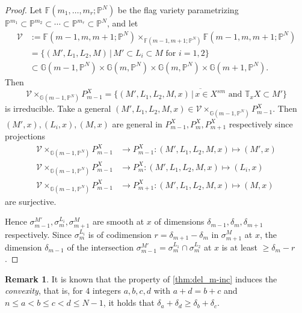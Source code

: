 \documentclass[a4paper,12pt]{amsart}
\theoremstyle{plain}
\theoremstyle{definition}
\newtheorem{rem}[rem]{Remark}
\begin{document}
\begin{proof}

  Let ${\mathbb {F}}(m_1,\ldots,m_r;{\mathbb{P}}^N)$ be the flag variety parametrizing
  ${\mathbb{P}}^{m_1} \subset {\mathbb{P}}^{m_2} \subset \cdots \subset {\mathbb{P}}^{m_r} \subset {\mathbb{P}}^N$,
  and let
  \begin{align*}
    {\mathcal {V}} &:= {\mathbb {F}}(m-1,m,m+1 ; {\mathbb{P}}^N) \times_{ {\mathbb {F}}(m-1, m+1 ; {\mathbb{P}}^N)}  {\mathbb {F}}(m-1,m,m+1 ; {\mathbb{P}}^N) \\
    &=\{ (M' ,L_1,L_2,M) \, | \, M' \subset L_i \subset M \text{ for } i=1,2 \} \\
    &\subset {\mathbb {G}}(m-1,{\mathbb{P}}^N) \times {\mathbb {G}}(m,{\mathbb{P}}^N) \times {\mathbb {G}}(m,{\mathbb{P}}^N) \times {\mathbb {G}}(m+1,{\mathbb{P}}^N) .
  \end{align*}
  Then
  \[
  {\mathcal {V}} \times_{{\mathbb {G}}(m-1,{\mathbb{P}}^N)} P_{m-1}^X =\overline{ \{ (M' ,L_1,L_2,M, x) \, | \, x \in X^{sm} \text{ and }{\mathbb {T}}_x X \subset M'  \} }
  \]
  is irreducible.
  Take a general $(M',L_1,L_2,M, x) \in  {\mathcal {V}} \times_{{\mathbb {G}}(m-1,{\mathbb{P}}^N)} P_{m-1}^X $.
  Then $( M', x) , (L_i, x), (M, x)  $ are general in $P_{m-1}^X, P_{m}^X, P_{m+1}^X$ respectively
  since projections
  \begin{align*}
    {\mathcal {V}} \times_{{\mathbb {G}}(m-1,{\mathbb{P}}^N)} P_{m-1}^X  &{\rightarrow} P_{m-1}^X : ( M',L_1,L_2,M, x) \mapsto ( M', x)   \\
    {\mathcal {V}} \times_{{\mathbb {G}}(m-1,{\mathbb{P}}^N)} P_{m-1}^X  &{\rightarrow} P_{m}^X : ( M',L_1,L_2,M, x) \mapsto  (L_i, x)  \\
    {\mathcal {V}} \times_{{\mathbb {G}}(m-1,{\mathbb{P}}^N)} P_{m-1}^X  &{\rightarrow} P_{m+1}^X : ( M',L_1,L_2,M, x) \mapsto  (M, x)  
  \end{align*}
  are surjective.

  Hence $\sigma_{m-1}^{M'}, \sigma_m^{L_i}, \sigma_{m+1}^{M}$ are smooth at $x$ of dimensions $\delta_{m-1}, \delta_m,\delta_{m+1}$ respectively.
  Since $\sigma_m^{L_i}$ is of codimension $r = \delta_{m+1} - \delta_{m}$ in $\sigma_{m+1}^{M}$ at $x$,
  the dimension $\delta_{m-1}$ of the intersection $ \sigma_{m-1}^{M'}=\sigma_m^{L_1} \cap \sigma_m^{L_2} $ at $x$ is at least ${\geqslant} \delta_m - r$.
\end{proof}

\begin{rem}
  It is known that the property of \autoref{thm:del_m-inc}
  induces the \emph{convexity}, that is,
  for $4$ integers $a,b,c,d$ with $a+d = b+c$ and $n {\leqslant} a < b {\leqslant} c < d {\leqslant} N-1$, it holds that
  $\delta_{a}+\delta_{d} {\geqslant} \delta_{b}+\delta_{c}$.
\end{rem}
\end{document}

